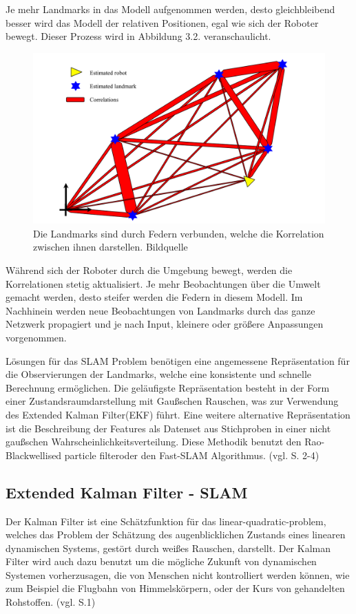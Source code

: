 Je mehr Landmarks in das Modell aufgenommen werden, desto gleichbleibend besser wird das Modell der relativen Positionen, egal wie sich der Roboter bewegt. Dieser Prozess wird in Abbildung 3.2. veranschaulicht.

\begin{figure}[H]
	\centering
	\includegraphics[scale=0.55]{slam_springs.png}
	\caption{Die Landmarks sind durch Federn verbunden, welche die Korrelation zwischen ihnen darstellen.  Bildquelle \cite{slam}}
\end{figure}  

Während sich der Roboter durch die Umgebung bewegt, werden die Korrelationen stetig aktualisiert. Je mehr Beobachtungen über die Umwelt gemacht werden, desto steifer werden die Federn in diesem Modell. Im Nachhinein werden neue Beobachtungen von Landmarks durch das ganze Netzwerk propagiert und je nach Input, kleinere oder größere Anpassungen vorgenommen.

Lösungen für das SLAM Problem benötigen eine angemessene Repräsentation für die Observierungen der Landmarks, welche eine konsistente und schnelle Berechnung ermöglichen. Die geläufigste Repräsentation besteht in der Form einer Zustandsraumdarstellung mit Gaußschen Rauschen, was zur Verwendung des \glqq Extended Kalman Filter\grqq (EKF) führt. Eine weitere alternative Repräsentation ist die Beschreibung der Features als Datenset aus Stichproben in einer nicht gaußschen Wahrscheinlichkeitsverteilung. Diese Methodik benutzt den \glqq Rao-Blackwellised particle filter\grqq oder den Fast-SLAM Algorithmus. (vgl. \cite{slam} S. 2-4)


\subsection{Extended Kalman Filter - SLAM}
Der Kalman Filter ist eine Schätzfunktion für das \glqq linear-quadratic-problem\grqq , welches das Problem der Schätzung des augenblicklichen Zustands eines linearen dynamischen Systems, gestört durch weißes Rauschen, darstellt. Der Kalman Filter wird auch dazu benutzt um die mögliche Zukunft von dynamischen Systemen vorherzusagen, die von Menschen nicht kontrolliert werden können, wie zum Beispiel die Flugbahn von Himmelskörpern, oder der Kurs von gehandelten Rohstoffen. (vgl. \cite{ekf} S.1)

